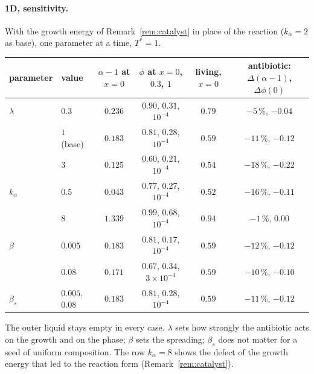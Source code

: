 \documentclass[11pt,a4paper]{article}
\begin{document}
\paragraph{1D, sensitivity.} With the growth energy of Remark~\ref{rem:catalyst} in place of
the reaction ($k_\alpha=2$ as base), one parameter at a time, $T^*=1$.
\begin{center}\small
\begin{tabular}{@{}llcccc@{}}
\toprule
parameter & value & $\alpha-1$ at $x=0$ & $\phi$ at $x=0$, $0.3$, $1$ & living, $x=0$ & antibiotic: $\Delta(\alpha-1)$, $\Delta\phi(0)$\\
\midrule
$\lambda$ & $0.3$ & $0.236$ & $0.90$, $0.31$, $10^{-4}$ & $0.79$ & $-5\,\%$, $-0.04$\\
 & $1$ (base) & $0.183$ & $0.81$, $0.28$, $10^{-4}$ & $0.59$ & $-11\,\%$, $-0.12$\\
 & $3$ & $0.125$ & $0.60$, $0.21$, $10^{-4}$ & $0.54$ & $-18\,\%$, $-0.22$\\
$k_\alpha$ & $0.5$ & $0.043$ & $0.77$, $0.27$, $10^{-4}$ & $0.52$ & $-16\,\%$, $-0.11$\\
 & $8$ & $1.339$ & $0.99$, $0.68$, $10^{-4}$ & $0.94$ & $-1\,\%$, $0.00$\\
$\beta$ & $0.005$ & $0.183$ & $0.81$, $0.17$, $10^{-4}$ & $0.59$ & $-12\,\%$, $-0.12$\\
 & $0.08$ & $0.171$ & $0.67$, $0.34$, $3\times10^{-4}$ & $0.59$ & $-10\,\%$, $-0.10$\\
$\beta_s$ & $0.005$, $0.08$ & $0.183$ & $0.81$, $0.28$, $10^{-4}$ & $0.59$ & $-11\,\%$, $-0.12$\\
\bottomrule
\end{tabular}
\end{center}
The outer liquid stays empty in every case. $\lambda$ sets how strongly the antibiotic acts on
the growth and on the phase; $\beta$ sets the spreading; $\beta_s$ does not matter for a seed of
uniform composition. The row $k_\alpha=8$ shows the defect of the growth energy that led to the
reaction form (Remark~\ref{rem:catalyst}).
\end{document}
